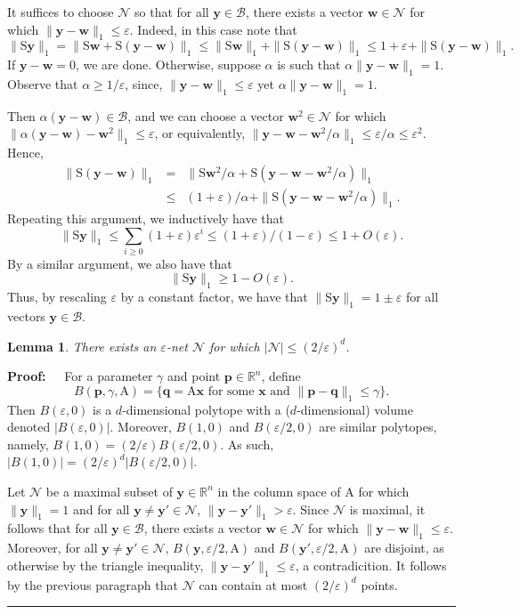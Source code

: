 \documentclass[11pt]{article}
\newtheorem{lemma}[theorem]{Lemma}
\newenvironment{proof}{\begin{trivlist} \item {\bf Proof:~~}}
  {\qed\end{trivlist}}
\newcommand{\mat}[1]{{\ensuremath{\bm{\mathrm{#1}}}}}
\def\q{{\mathbf q}}
\def\p{{\mathbf p}}
\def\matA{\mat{A}}
\def\matS{\mat{S}}
\def\w{{\mathbf{w}}}
\def\qed{\hfill\rule{2mm}{2mm}}
\def\x{{\mathbf x}}
\def\y{{\mathbf y}}
\newcommand{\eps}{\varepsilon}
\begin{document}
It suffices to choose $\mathcal{N}$ so that for all $\y \in \mathcal{B}$, 
there exists a vector $\w \in \mathcal{N}$ for which $\|\y-\w\|_1 \leq \eps$.
Indeed, in this case note that 
$$\|\matS \y\|_1 = \|\matS \w + \matS(\y-\w)\|_1 \leq \|\matS \w\|_1 + \|\matS(\y-\w)\|_1 \leq 1+\eps + \|\matS(\y-\w)\|_1.$$
If $\y-\w = 0$, we are done. Otherwise, suppose $\alpha$ is such that $\alpha \|\y-\w\|_1 = 1$. 
Observe that $\alpha \geq 1/\eps$, since, $\|\y-\w\|_1 \leq \eps$ yet $\alpha \|\y-\w\|_1 = 1$. 

Then $\alpha(\y-\w) \in \mathcal{B}$, and we can
choose a vector $\w^2 \in \mathcal{N}$ for which $\|\alpha(\y-\w) - \w^2\|_1 \leq \eps$, or equivalently,
$\|\y-\w - \w^2/\alpha\|_1 \leq \eps/\alpha \leq \eps^2$. Hence,
\begin{eqnarray*}
\|\matS(\y-\w)\|_1 &= &\|\matS \w^2/\alpha + \matS(\y-\w-\w^2/\alpha)\|_1\\
&\leq & (1+\eps)/\alpha + \|\matS(\y-\w-\w^2/\alpha)\|_1.
\end{eqnarray*}
Repeating this argument, we inductively have that 
$$\|\matS \y\|_1 \leq \sum_{i \geq 0} (1+\eps) \eps^i \leq (1+\eps)/(1-\eps) \leq 1+O(\eps).$$
By a similar argument, we also have that
$$\|\matS \y\|_1 \geq 1-O(\eps).$$
Thus, by rescaling $\eps$ by a constant factor, we have that $\|\matS \y\|_1 = 1 \pm \eps$ 
for all vectors $\y \in \mathcal{B}$. 

\begin{lemma}\label{lem:eps-net}
There exists an $\eps$-net $\mathcal{N}$ for which $|\mathcal{N}| \leq (2/\eps)^d$. 
\end{lemma}
\begin{proof}
For a parameter $\gamma$ and point $\p \in \mathbb{R}^n$, 
define $$B(\p, \gamma, \matA) = \{\q = \matA \x \textrm{ for some } \x \textrm{ and } \|\p-\q\|_1 \leq \gamma\}.$$
Then $B(\eps, 0)$ is a $d$-dimensional polytope with a ($d$-dimensional) volume denoted $|B(\eps, 0)|$. 
Moreover, 
$B(1,0)$ and $B(\eps/2, 0)$ are similar polytopes, namely, $B(1,0) = (2/\eps)B(\eps/2,0)$. 
As such, $|B(1,0)| = (2/\eps)^d |B(\eps/2,0)|$. 

Let $\mathcal{N}$ be a maximal subset of $\y \in \mathbb{R}^n$ in the column space of $\matA$ for which $\|\y\|_1 = 1$ and 
for all $\y \neq \y' \in \mathcal{N}$, $\|\y-\y'\|_1 > \eps$. Since $\mathcal{N}$ is maximal, it follows that for all 
$\y \in \mathcal{B}$,
there exists a vector $\w \in \mathcal{N}$ for which $\|\y-\w\|_1 \leq \eps$. 
Moreover, for all $\y \neq \y' \in \mathcal{N}$, 
$B(\y, \eps/2, \matA)$ and $B(\y',\eps/2,\matA)$ are disjoint, 
as otherwise by the triangle inequality, $\|\y-\y'\|_1 \leq \eps$, a contradicition. 
It follows by the previous paragraph that $\mathcal{N}$ can contain at most $(2/\eps)^d$ points. 
\end{proof}
\end{document}
